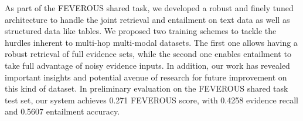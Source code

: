 As part of the FEVEROUS shared task, we developed a robust and finely tuned architecture to handle the joint retrieval and entailment on text data as well as structured data like tables. We proposed two training schemes to tackle the hurdles inherent to multi-hop multi-modal datasets. The first one allows having a robust retrieval of full evidence sets, while the second one enables entailment to take full advantage of noisy evidence inputs. In addition, our work has revealed important insights and potential avenue of research for future improvement on this kind of dataset. In preliminary evaluation on the FEVEROUS shared task test set, our system achieves 0.271 FEVEROUS score, with 0.4258 evidence recall and 0.5607 entailment accuracy.
